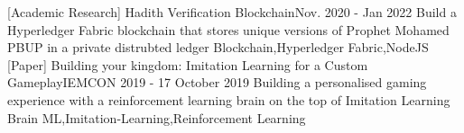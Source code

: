 

\begin{projects}
		\project
	{[Academic Research] Hadith Verification Blockchain}{Nov. 2020 - Jan 2022}
	{}
	{Build a Hyperledger Fabric blockchain that stores unique versions of Prophet Mohamed PBUP in a private distrubted ledger }
	{Blockchain,Hyperledger Fabric,NodeJS}	
			\project
	{[Paper] Building your kingdom: Imitation Learning for a Custom Gameplay}{IEMCON 2019 - 17 October 2019}
	{\paperSymbol{ }
	}
	{Building a personalised gaming experience with a reinforcement learning brain on the top of Imitation Learning Brain}
	{ML,Imitation-Learning,Reinforcement Learning}
\end{projects}